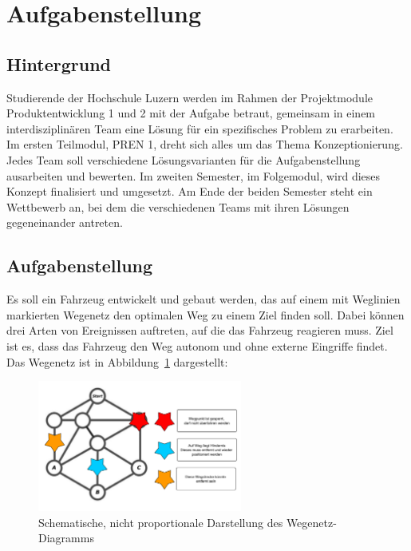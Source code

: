 \documentclass[../main.tex]{subfiles}
\begin{document}
\section{Aufgabenstellung}

\subsection{Hintergrund}

Studierende der Hochschule Luzern werden im Rahmen der Projektmodule
Produktentwicklung 1 und 2 mit der Aufgabe betraut, gemeinsam in einem
interdisziplinären Team eine Lösung für ein spezifisches Problem zu erarbeiten.
Im ersten Teilmodul, PREN 1, dreht sich alles um das Thema Konzeptionierung.
Jedes Team soll verschiedene Lösungsvarianten für die Aufgabenstellung
ausarbeiten und bewerten. Im zweiten Semester, im Folgemodul, wird dieses
Konzept finalisiert und umgesetzt. Am Ende der beiden Semester steht ein
Wettbewerb an, bei dem die verschiedenen Teams mit ihren Lösungen gegeneinander
antreten.

\subsection{Aufgabenstellung}

Es soll ein Fahrzeug entwickelt und gebaut werden, das auf einem mit Weglinien
markierten Wegenetz den optimalen Weg zu einem Ziel finden soll. Dabei können
drei Arten von Ereignissen auftreten, auf die das Fahrzeug reagieren muss. Ziel
ist es, dass das Fahrzeug den Weg autonom und ohne externe Eingriffe findet.
Das Wegenetz ist in Abbildung~\ref{fig:wegenetz} dargestellt:

\begin{figure}[h!]
    \centering
    \includegraphics[width=0.6\textwidth]{./resources/Abbildung_Wegenetz.pdf}
    \caption{Schematische, nicht proportionale Darstellung des Wegenetz-Diagramms}
    \label{fig:wegenetz}
\end{figure}
\end{document}
